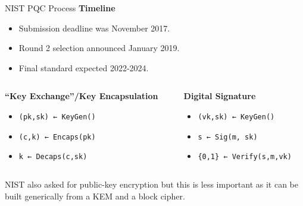 \documentclass[xcolor=table,10pt,aspectratio=169]{beamer}
\begin{document}
\begin{frame}[label={sec:orge1f7d32},fragile]{NIST PQC {\color{lightgray}{Competition} }Process}
 \textbf{Timeline}

\begin{itemize}
\item Submission deadline was November 2017.
\item Round 2 selection announced January 2019.
\item Final standard expected 2022-2024.
\end{itemize}

\vspace{1em}

\begin{columns}[t]
\begin{column}{0.5\columnwidth}
\textbf{“Key Exchange”/Key Encapsulation}

\begin{itemize}
\item \texttt{(pk,sk) ← KeyGen()}
\item \texttt{(c,k) ← Encaps(pk)}
\item \texttt{k ← Decaps(c,sk)}
\end{itemize}
\end{column}

\begin{column}{0.5\columnwidth}
\textbf{Digital Signature}

\begin{itemize}
\item \texttt{(vk,sk)  ← KeyGen()}
\item \texttt{s  ← Sig(m, sk)}
\item \texttt{\{0,1\}  ← Verify(s,m,vk)}
\end{itemize}
\end{column}
\end{columns}

\vspace{1em}
\pause

NIST also asked for public-key encryption but this is less important as it can be built generically from a KEM and a block cipher.
\end{frame}
\end{document}

